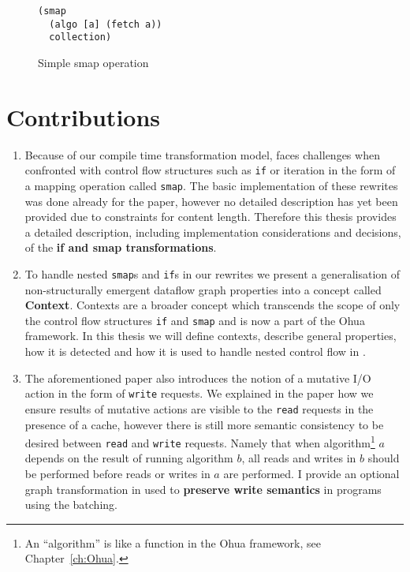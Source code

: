\begin{figure}[h]
\begin{verbatim}
(smap
  (algo [a] (fetch a))
  collection)
\end{verbatim}
\caption{Simple smap operation}
\label{fig:simple-smap-operation}
\end{figure}

\section{Contributions}

\begin{enumerate}
    \item Because of our compile time transformation model, \yauhau{} faces challenges when confronted with control flow structures such as \texttt{if} or iteration in the form of a mapping operation called \texttt{smap}.
    The basic implementation of these rewrites was done already for the paper, however no detailed description has yet been provided due to constraints for content length.
    Therefore this thesis provides a detailed description, including implementation considerations and decisions, of the \textbf{if and smap transformations}.
    \item To handle nested \texttt{smap}s and \texttt{if}s in our rewrites we present a generalisation of non-structurally emergent dataflow graph properties into a concept called \textbf{Context}.
    Contexts are a broader concept which transcends the scope of only the control flow structures \texttt{if} and \texttt{smap} and is now a part of the Ohua framework.
    In this thesis we will define contexts, describe general properties, how it is detected and how it is used to handle nested control flow in \yauhau{}.
    \item The aforementioned paper also introduces the notion of a mutative I/O action in the form of \texttt{write} requests.
    We explained in the paper how we ensure results of mutative actions are visible to the \texttt{read} requests in the presence of a cache, however there is still more semantic consistency to be desired between \texttt{read} and \texttt{write} requests.
    Namely that when algorithm\footnote{An ``algorithm'' is like a function in the Ohua framework, see Chapter~\ref{ch:Ohua}.} $a$ depends on the result of running algorithm $b$, all reads and writes in $b$ should be performed before reads or writes in $a$ are performed.
    I provide an optional graph transformation in \yauhau{} used to \textbf{preserve write semantics} in programs using the \yauhau{} batching.

\end{enumerate}
